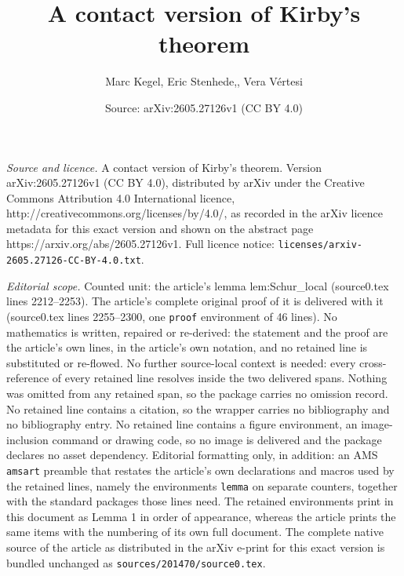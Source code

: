 \documentclass[10pt,a4paper]{amsart}
\title{A contact version of Kirby's theorem}
\author{Marc Kegel, Eric Stenhede,, Vera V\'ertesi}
\date{Source: arXiv:2605.27126v1 (CC BY 4.0)}
\begin{document}
\maketitle

\noindent\emph{Source and licence.} A contact version of Kirby's theorem. Version arXiv:2605.27126v1 (CC BY 4.0), distributed by arXiv under the Creative Commons Attribution 4.0 International licence, http://creativecommons.org/licenses/by/4.0/, as recorded in the arXiv licence metadata for this exact version and shown on the abstract page https://arxiv.org/abs/2605.27126v1. Full licence notice: \texttt{licenses/arxiv-2605.27126-CC-BY-4.0.txt}.\par\smallskip

\noindent\textit{Editorial scope.} Counted unit: the article's lemma lem:Schur\_local (source0.tex lines 2212--2253). The article's complete original proof of it is delivered with it (source0.tex lines 2255--2300, one \texttt{proof} environment of 46 lines). No mathematics is written, repaired or re-derived: the statement and the proof are the article's own lines, in the article's own notation, and no retained line is substituted or re-flowed.  No further source-local context is needed: every cross-reference of every retained line resolves inside the two delivered spans.  Nothing was omitted from any retained span, so the package carries no omission record.  No retained line contains a citation, so the wrapper carries no bibliography and no bibliography entry.  No retained line contains a figure environment, an image-inclusion command or drawing code, so no image is delivered and the package declares no asset dependency.  Editorial formatting only, in addition: an AMS \texttt{amsart} preamble that restates the article's own declarations and macros used by the retained lines, namely the environments \texttt{lemma} on separate counters, together with the standard packages those lines need.  The retained environments print in this document as Lemma 1 in order of appearance, whereas the article prints the same items with the numbering of its own full document.  The complete native source of the article as distributed in the arXiv e-print for this exact version is bundled unchanged as \texttt{sources/201470/source0.tex}.
\end{document}
